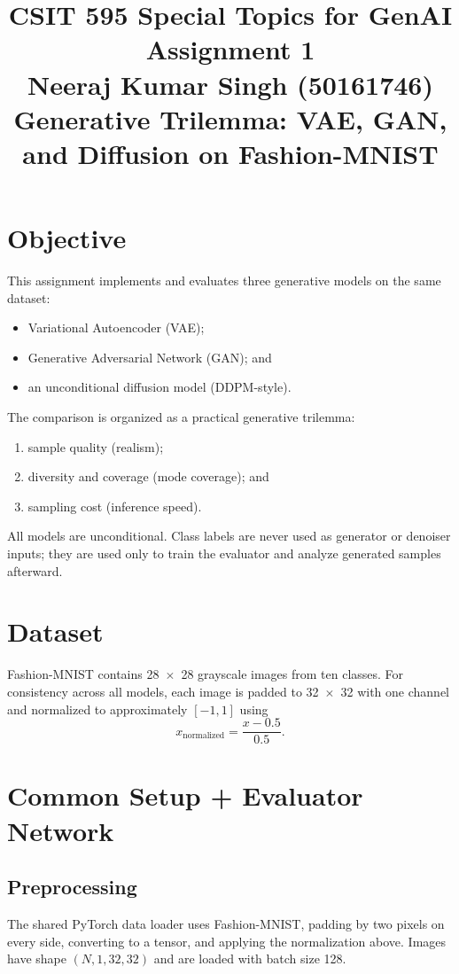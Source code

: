\documentclass[11pt]{article}
\title{\textbf{CSIT 595 Special Topics for GenAI\\ Assignment 1 \\ \large Neeraj Kumar Singh (50161746)}\\
Generative Trilemma: VAE, GAN, and Diffusion on Fashion-MNIST}
\author{}
\date{}
\begin{document}
\maketitle

\section*{Objective}

This assignment implements and evaluates three generative models on the same dataset:
\begin{itemize}
\item Variational Autoencoder (VAE);
\item Generative Adversarial Network (GAN); and
\item an unconditional diffusion model (DDPM-style).
\end{itemize}

The comparison is organized as a practical generative trilemma:
\begin{enumerate}
\item sample quality (realism);
\item diversity and coverage (mode coverage); and
\item sampling cost (inference speed).
\end{enumerate}

All models are unconditional. Class labels are never used as generator or denoiser inputs; they are used only to train the evaluator and analyze generated samples afterward.

\section*{Dataset}

Fashion-MNIST contains 28~$\times$~28 grayscale images from ten classes. For consistency across all models, each image is padded to 32~$\times$~32 with one channel and normalized to approximately $[-1,1]$ using
\[
x_{\mathrm{normalized}}=\frac{x-0.5}{0.5}.
\]

\section{Common Setup + Evaluator Network}

\subsection{Preprocessing}

The shared PyTorch data loader uses Fashion-MNIST, padding by two pixels on every side, converting to a tensor, and applying the normalization above. Images have shape $(N,1,32,32)$ and are loaded with batch size 128.
\end{document}
